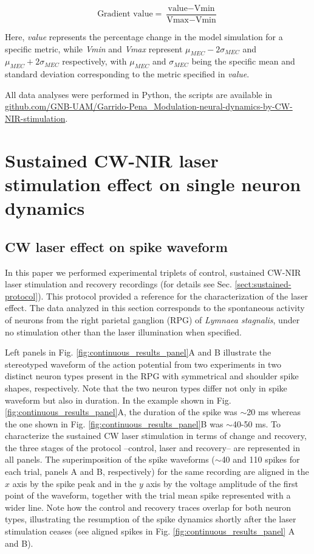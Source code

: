 \[\text{Gradient value} = \frac{\text{value} - \text{Vmin}}{\text{Vmax} - \text{Vmin}}\]

Here, \textit{value} represents the percentage change in the model simulation for a specific metric, while \textit{Vmin} and \textit{Vmax} represent $\mu_{MEC}-2\sigma_{MEC}$ and $\mu_{MEC}+2\sigma_{MEC}$ respectively, with $\mu_{MEC}$ and $\sigma_{MEC}$ being the specific mean and standard deviation corresponding to the metric specified in \textit{value}.

All data analyses were performed in Python, the scripts are available in \href{https://github.com/GNB-UAM/Garrido-Pena_Modulation-neural-dynamics-by-CW-NIR-stimulation}{github.com/GNB-UAM/Garrido-Pena\_Modulation-neural-dynamics-by-CW-NIR-stimulation}.



\section{Sustained CW-NIR laser stimulation effect on single neuron dynamics}
\subsection{CW laser effect on spike waveform}
In this paper we performed experimental triplets of control, sustained CW-NIR laser stimulation and recovery recordings (for details see Sec. \ref{sect:sustained-protocol}). This protocol provided a reference for the characterization of the laser effect. The data analyzed in this section corresponds to the spontaneous activity of neurons from the right parietal ganglion (RPG) of \textit{Lymnaea stagnalis}, under no stimulation other than the laser illumination when specified.

Left panels in Fig. \ref{fig:continuous_results_panel}A and B illustrate the stereotyped waveform of the action potential from two experiments in two distinct neuron types present in the RPG with symmetrical and shoulder spike shapes, respectively. Note that the two neuron types differ not only in spike waveform but also in duration. In the example shown in Fig. \ref{fig:continuous_results_panel}A, the duration of the spike was $\sim$20 ms whereas the one shown in Fig. \ref{fig:continuous_results_panel}B was $\sim$40-50 ms. To characterize the sustained CW laser stimulation in terms of change and recovery, the three stages of the protocol --control, laser and recovery-- are represented in all panels. The superimposition of the spike waveforms ($\sim$40 and 110 spikes for each trial, panels A and B, respectively) for the same recording are aligned in the $x$ axis by the spike peak and in the $y$ axis by the voltage amplitude of the first point of the waveform, together with the trial mean spike represented with a wider line. Note how the control and recovery traces overlap for both neuron types, illustrating the resumption of the spike dynamics shortly after the laser stimulation ceases (see aligned spikes in Fig. \ref{fig:continuous_results_panel} A and B).

